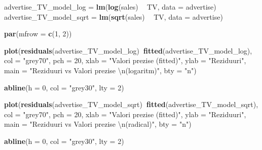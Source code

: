 \documentclass[]{article}
\newenvironment{Shaded}{\begin{snugshade}}{\end{snugshade}}
\newcommand{\KeywordTok}[1]{\textcolor[rgb]{0.13,0.29,0.53}{\textbf{#1}}}
\newcommand{\DataTypeTok}[1]{\textcolor[rgb]{0.13,0.29,0.53}{#1}}
\newcommand{\DecValTok}[1]{\textcolor[rgb]{0.00,0.00,0.81}{#1}}
\newcommand{\CharTok}[1]{\textcolor[rgb]{0.31,0.60,0.02}{#1}}
\newcommand{\StringTok}[1]{\textcolor[rgb]{0.31,0.60,0.02}{#1}}
\newcommand{\OperatorTok}[1]{\textcolor[rgb]{0.81,0.36,0.00}{\textbf{#1}}}
\newcommand{\NormalTok}[1]{#1}
\begin{document}
\begin{Shaded}
\begin{Highlighting}[]

\NormalTok{advertise_TV_model_log =}\StringTok{ }\KeywordTok{lm}\NormalTok{(}\KeywordTok{log}\NormalTok{(sales) }\OperatorTok{~}\StringTok{ }\NormalTok{TV, }\DataTypeTok{data =}\NormalTok{ advertise)}
\NormalTok{advertise_TV_model_sqrt =}\StringTok{ }\KeywordTok{lm}\NormalTok{(}\KeywordTok{sqrt}\NormalTok{(sales) }\OperatorTok{~}\StringTok{ }\NormalTok{TV, }\DataTypeTok{data =}\NormalTok{ advertise)}

\KeywordTok{par}\NormalTok{(}\DataTypeTok{mfrow =} \KeywordTok{c}\NormalTok{(}\DecValTok{1}\NormalTok{, }\DecValTok{2}\NormalTok{))}

\KeywordTok{plot}\NormalTok{(}\KeywordTok{residuals}\NormalTok{(advertise_TV_model_log)}\OperatorTok{~}\KeywordTok{fitted}\NormalTok{(advertise_TV_model_log),  }
     \DataTypeTok{col =} \StringTok{"grey70"}\NormalTok{, }\DataTypeTok{pch =} \DecValTok{20}\NormalTok{, }
     \DataTypeTok{xlab =} \StringTok{"Valori prezise (fitted)"}\NormalTok{,}
     \DataTypeTok{ylab =} \StringTok{"Reziduuri"}\NormalTok{, }
     \DataTypeTok{main =} \StringTok{"Reziduuri vs Valori prezise }\CharTok{\textbackslash{}n}\StringTok{(logaritm)"}\NormalTok{,}
     \DataTypeTok{bty =} \StringTok{"n"}\NormalTok{)}

\KeywordTok{abline}\NormalTok{(}\DataTypeTok{h =} \DecValTok{0}\NormalTok{, }\DataTypeTok{col =} \StringTok{"grey30"}\NormalTok{, }\DataTypeTok{lty =} \DecValTok{2}\NormalTok{)}

\KeywordTok{plot}\NormalTok{(}\KeywordTok{residuals}\NormalTok{(advertise_TV_model_sqrt)}\OperatorTok{~}\KeywordTok{fitted}\NormalTok{(advertise_TV_model_sqrt),  }
     \DataTypeTok{col =} \StringTok{"grey70"}\NormalTok{, }\DataTypeTok{pch =} \DecValTok{20}\NormalTok{, }
     \DataTypeTok{xlab =} \StringTok{"Valori prezise (fitted)"}\NormalTok{,}
     \DataTypeTok{ylab =} \StringTok{"Reziduuri"}\NormalTok{, }
     \DataTypeTok{main =} \StringTok{"Reziduuri vs Valori prezise }\CharTok{\textbackslash{}n}\StringTok{(radical)"}\NormalTok{,}
     \DataTypeTok{bty =} \StringTok{"n"}\NormalTok{)}

\KeywordTok{abline}\NormalTok{(}\DataTypeTok{h =} \DecValTok{0}\NormalTok{, }\DataTypeTok{col =} \StringTok{"grey30"}\NormalTok{, }\DataTypeTok{lty =} \DecValTok{2}\NormalTok{)}
\end{Highlighting}
\end{Shaded}
\end{document}
